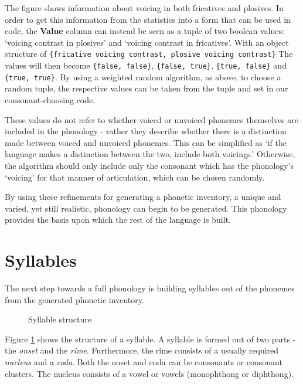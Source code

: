 \documentclass{report}
\begin{document}
	The figure shows information about voicing in both fricatives and plosives. In order to get this information from the statistics into a form that can be used in code, the \textbf{Value} column can instead be seen as a tuple of two boolean values: `voicing contrast in plosives' and `voicing contrast in fricatives'. With an object structure of \verb|{fricative voicing contrast, plosive voicing contrast}| The values will then become \verb|{false, false}|, \verb|{false, true}|, \verb|{true, false}| and \verb|{true, true}|. By using a weighted random algorithm, as above, to choose a random tuple, the respective values can be taken from the tuple and set in our consonant-choosing code.
	
	These values do not refer to whether voiced or unvoiced phonemes themselves are included in the phonology - rather they describe whether there is a distinction made between voiced and unvoiced phonemes. This can be simplified as `if the language makes a distinction between the two, include both voicings.' Otherwise, the algorithm should only include only the consonant which has the phonology's `voicing' for that manner of articulation, which can be chosen randomly.
	
	By using these refinements for generating a phonetic inventory, a unique and varied, yet still realistic, phonology can begin to be generated. This phonology provides the basis upon which the rest of the language is built.

	\section{Syllables}
	\label{section: syllables}
	
	The next step towards a full phonology is building syllables out of the phonemes from the generated phonetic inventory.
	
	\begin{figure}[h]
		\caption{Syllable structure}
		\label{syllable structure}
		\centering
	\end{figure}

	Figure \ref{syllable structure} shows the structure of a syllable. A syllable is formed out of two parts - the \textit{onset} and the \textit{rime}. Furthermore, the rime consists of a usually required \textit{nucleus} and a \textit{coda}. Both the onset and coda can be consonants or consonant clusters. The nucleus consists of a vowel or vowels (monophthong or diphthong).
	
\end{document}
